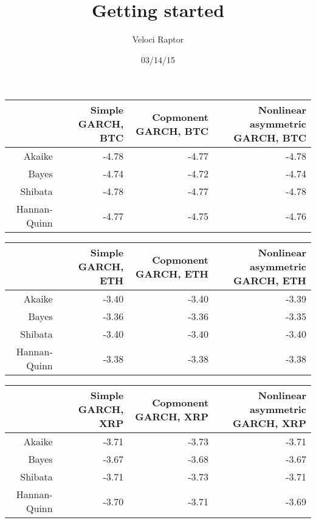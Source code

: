 \documentclass[12pt]{article}
\title{Getting started}
\author{Veloci Raptor}
\date{03/14/15}
\begin{document}
	\begin{table}[ht]
		\centering
		\begin{tabular}{rrrr}
			\hline
			& Simple GARCH, BTC & Copmonent GARCH, BTC & Nonlinear asymmetric GARCH, BTC \\ 
			\hline
			Akaike & -4.78 & -4.77 & -4.78 \\ 
			Bayes & -4.74 & -4.72 & -4.74 \\ 
			Shibata & -4.78 & -4.77 & -4.78 \\ 
			Hannan-Quinn & -4.77 & -4.75 & -4.76 \\ 
			\hline
		\end{tabular}
	\end{table}
	\begin{table}[ht]
		\centering
		\begin{tabular}{rrrr}
			\hline
			& Simple GARCH, ETH & Copmonent GARCH, ETH & Nonlinear asymmetric GARCH, ETH \\ 
			\hline
			Akaike & -3.40 & -3.40 & -3.39 \\ 
			Bayes & -3.36 & -3.36 & -3.35 \\ 
			Shibata & -3.40 & -3.40 & -3.40 \\ 
			Hannan-Quinn & -3.38 & -3.38 & -3.38 \\ 
			\hline
		\end{tabular}
	\end{table}
	\begin{table}[ht]
		\centering
		\begin{tabular}{rrrr}
			\hline
			& Simple GARCH, XRP & Copmonent GARCH, XRP & Nonlinear asymmetric GARCH, XRP \\ 
			\hline
			Akaike & -3.71 & -3.73 & -3.71 \\ 
			Bayes & -3.67 & -3.68 & -3.67 \\ 
			Shibata & -3.71 & -3.73 & -3.71 \\ 
			Hannan-Quinn & -3.70 & -3.71 & -3.69 \\ 
			\hline
		\end{tabular}
	\end{table}
\end{document}
